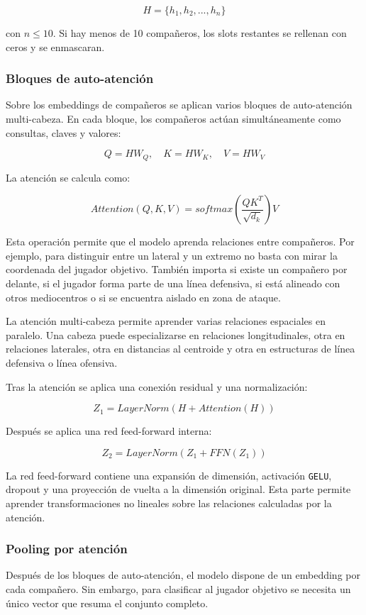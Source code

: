 \[
H = \{h_1, h_2, ..., h_n\}
\]

con $n \leq 10$. Si hay menos de 10 compañeros, los slots restantes se rellenan con ceros y se enmascaran.

\subsubsection{Bloques de auto-atención}

Sobre los embeddings de compañeros se aplican varios bloques de auto-atención multi-cabeza. En cada bloque, los compañeros actúan simultáneamente como consultas, claves y valores:

\[
Q = HW_Q,\quad K = HW_K,\quad V = HW_V
\]

La atención se calcula como:

\[
Attention(Q,K,V)=softmax\left(\frac{QK^T}{\sqrt{d_k}}\right)V
\]

Esta operación permite que el modelo aprenda relaciones entre compañeros. Por ejemplo, para distinguir entre un lateral y un extremo no basta con mirar la coordenada del jugador objetivo. También importa si existe un compañero por delante, si el jugador forma parte de una línea defensiva, si está alineado con otros mediocentros o si se encuentra aislado en zona de ataque.

La atención multi-cabeza permite aprender varias relaciones espaciales en paralelo. Una cabeza puede especializarse en relaciones longitudinales, otra en relaciones laterales, otra en distancias al centroide y otra en estructuras de línea defensiva o línea ofensiva.

Tras la atención se aplica una conexión residual y una normalización:

\[
Z_1 = LayerNorm(H + Attention(H))
\]

Después se aplica una red feed-forward interna:

\[
Z_2 = LayerNorm(Z_1 + FFN(Z_1))
\]

La red feed-forward contiene una expansión de dimensión, activación \texttt{GELU}, dropout y una proyección de vuelta a la dimensión original. Esta parte permite aprender transformaciones no lineales sobre las relaciones calculadas por la atención.

\subsubsection{Pooling por atención}

Después de los bloques de auto-atención, el modelo dispone de un embedding por cada compañero. Sin embargo, para clasificar al jugador objetivo se necesita un único vector que resuma el conjunto completo.

